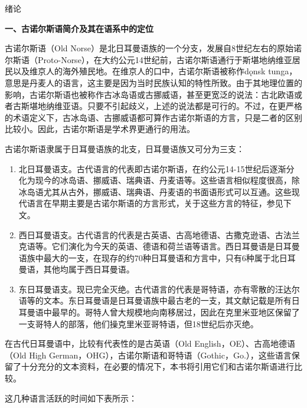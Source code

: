 绪论

\textbf{一、古诺尔斯语简介及其在语系中的定位}

古诺尔斯语（Old
Norse）是北日耳曼语族的一个分支，发展自8世纪左右的原始诺尔斯语（Proto-Norse），在大约公元14世纪前，古诺尔斯语通行于斯堪地纳维亚居民以及维京人的海外殖民地。在维京人的口中，古诺尔斯语被称作dǫnsk
tunga，意思是丹麦人的语言，这主要是因为当时民族认知的特性所致。由于其地理位置的影响，古诺尔斯语也被称作古冰岛语或古挪威语，甚至更宽泛的说法：古北欧语或者古斯堪地纳维亚语。只要不引起歧义，上述的说法都是可行的。不过，在更严格的术语定义下，古冰岛语、古挪威语都可算作古诺尔斯语的方言，只是二者的区别比较小。因此，古诺尔斯语是学术界更通行的用法。

古诺尔斯语隶属于日耳曼语族的北支，日耳曼语族又可分为三支：

\begin{enumerate}
  \def\labelenumi{\arabic{enumi}.}
  \item
        北日耳曼语支。古代语言的代表即古诺尔斯语，在约公元14-15世纪后逐渐分化为现今的冰岛语、挪威语、瑞典语、丹麦语等。这些语言相似程度很高，除冰岛语尤其从古外，挪威语、瑞典语、丹麦语的书面语形式可以互通。这些现代语言在早期主要是古诺尔斯语的方言形式，关于这些方言的特征，参见下文。
  \item
        西日耳曼语支。古代语言的代表是古英语、古高地德语、古撒克逊语、古法兰克语等。它们演化为今天的英语、德语和荷兰语等语言。西日耳曼语是日耳曼语族中最大的一支，在现存的约70种日耳曼语和方言中，只有6种属于北日耳曼语，其他均属于西日耳曼语。
  \item
        东日耳曼语支。现已完全灭绝。古代语言的代表是哥特语，亦有零散的汪达尔语等的文本。东日耳曼语是日耳曼语族中最古老的一支，其文献记载是所有日耳曼语中最早的。哥特人曾大规模地向南移居过，因此在克里米亚地区保留了一支哥特人的部落，他们操克里米亚哥特语，但18世纪后亦灭绝。
\end{enumerate}

在古代日耳曼语中，比较有代表性的是古英语（Old
English，OE）、古高地德语（Old High
German，OHG），古诺尔斯语和哥特语（Gothic，Go.），这些语言保留了十分充分的文本资料，在必要的情况下，本书将引用它们和古诺尔斯语进行比较。

这几种语言活跃的时间如下表所示：

